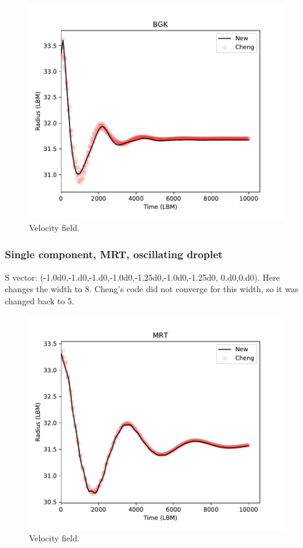 \documentclass{article}
\begin{document}
	\begin{figure}[h]
		\centering
		\includegraphics[scale=0.50]{pics/BGKOsc.pdf}
		\caption{Velocity field.}
		\label{fig:val1CBGK_Osc4}
	\end{figure}
	
	\newpage
	\subsubsection{Single component, MRT, oscillating droplet}
	S vector: (-1.0d0,-1.d0,-1.d0,-1.0d0,-1.25d0,-1.0d0,-1.25d0, 0.d0,0.d0). Here changes the width to 8. Cheng's code did not converge for this width, so it was changed back to 5.
	\begin{figure}[h]
		\centering
		\includegraphics[scale=0.5]{pics/MRTOsc.pdf}
		\caption{Velocity field.}
		\label{fig:MRTOsc}
	\end{figure}
	
\end{document}
